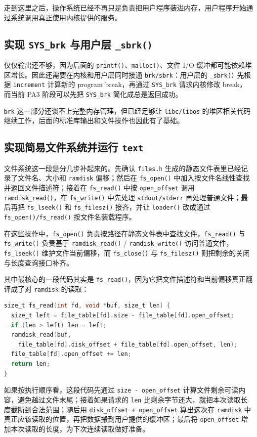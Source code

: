 \documentclass[a4paper]{article}
\begin{document}
走到这里之后，操作系统已经不再只是负责把用户程序装进内存，用户程序开始通过系统调用真正使用内核提供的服务。

\subsection{实现 \texttt{SYS\_brk} 与用户层 \texttt{\_sbrk()}}
仅仅输出还不够，因为后面的 \texttt{printf()}、\texttt{malloc()}、文件 I/O 缓冲都可能依赖堆区增长。因此还需要在内核和用户层同时接通 \texttt{brk/sbrk}：用户层的 \texttt{\_sbrk()} 先根据 \texttt{increment} 计算新的 program break，再通过 \texttt{SYS\_brk} 请求内核修改 break，而当前 PA3 阶段可以先把 \texttt{SYS\_brk} 简化成总是返回成功。

\texttt{brk} 这一部分还谈不上完整内存管理，但已经足够让 \texttt{libc/libos} 的堆区相关代码继续工作，后面的标准库输出和文件操作也因此有了基础。

\subsection{实现简易文件系统并运行 \texttt{text}}
文件系统这一段是分几步补起来的。先确认 \texttt{files.h} 生成的静态文件表里已经记录了文件名、大小和 \texttt{ramdisk} 偏移；然后在 \texttt{fs\_open()} 中加入按文件名线性查找并返回文件描述符；接着在 \texttt{fs\_read()} 中按 \texttt{open\_offset} 调用 \texttt{ramdisk\_read()}，在 \texttt{fs\_write()} 中先处理 \texttt{stdout/stderr} 再处理普通文件；最后再把 \texttt{fs\_lseek()} 和 \texttt{fs\_filesz()} 接齐，并让 \texttt{loader()} 改成通过 \texttt{fs\_open()/fs\_read()} 按文件名装载程序。

在这些操作中，\texttt{fs\_open()} 负责按路径在静态文件表中查找文件，\texttt{fs\_read()} 与 \texttt{fs\_write()} 负责基于 \texttt{ramdisk\_read()} / \texttt{ramdisk\_write()} 访问普通文件，\texttt{fs\_lseek()} 维护文件当前偏移，而 \texttt{fs\_close()} 与 \texttt{fs\_filesz()} 则把剩余的关闭与长度查询接口补齐。

其中最核心的一段代码其实是 \texttt{fs\_read()}，因为它把文件描述符和当前偏移真正翻译成了对 \texttt{ramdisk} 的读取：
\begin{lstlisting}[language=C]
size_t fs_read(int fd, void *buf, size_t len) {
  size_t left = file_table[fd].size - file_table[fd].open_offset;
  if (len > left) len = left;
  ramdisk_read(buf,
    file_table[fd].disk_offset + file_table[fd].open_offset, len);
  file_table[fd].open_offset += len;
  return len;
}
\end{lstlisting}

如果按执行顺序看，这段代码先通过 \texttt{size - open\_offset} 计算文件剩余可读内容，避免越过文件末尾；接着如果请求的 \texttt{len} 比剩余字节还大，就把本次读取长度截断到合法范围；随后用 \texttt{disk\_offset + open\_offset} 算出这次在 \texttt{ramdisk} 中真正应该读取的位置，再把数据搬到用户提供的缓冲区；最后将 \texttt{open\_offset} 增加本次读取的长度，为下次连续读取做好准备。
\end{document}
